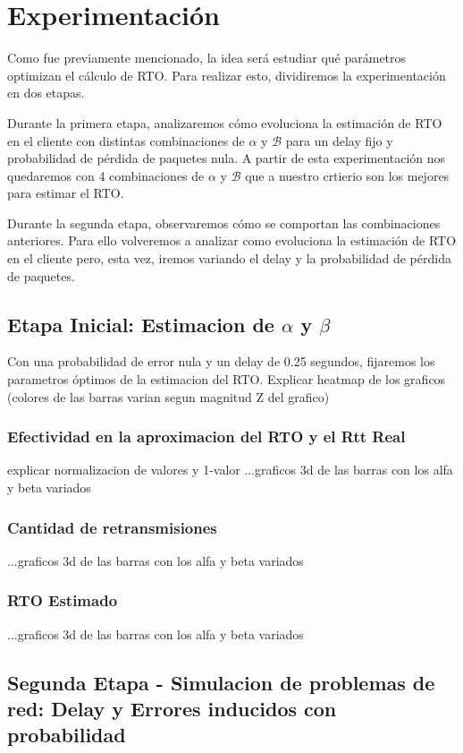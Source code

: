 \section{Experimentaci\'on}

Como fue previamente mencionado, la idea ser\'a estudiar qu\'e par\'ametros optimizan el c\'alculo de RTO. Para realizar esto, dividiremos la experimentaci\'on en dos etapas.

Durante la primera etapa, analizaremos c\'omo evoluciona la estimaci\'on de RTO en el cliente con distintas combinaciones de $\alpha$ y $\mathcal{B}$ para un delay fijo y probabilidad de p\'erdida de paquetes nula. A partir de esta experimentaci\'on nos quedaremos con 4 combinaciones de $\alpha$ y $\mathcal{B}$ que a nuestro crtierio son los mejores para estimar el RTO.

Durante la segunda etapa, observaremos c\'omo se comportan las combinaciones anteriores. Para ello volveremos a analizar como evoluciona la estimaci\'on de RTO en el cliente pero, esta vez, iremos variando el delay y la probabilidad de p\'erdida de paquetes. 

\subsection{Etapa Inicial: Estimacion de $\alpha$ y $\beta$}
Con una probabilidad de error nula y un delay de 0.25 segundos, fijaremos los parametros \'optimos de la estimacion del RTO.
Explicar heatmap de los graficos (colores de las barras varian segun magnitud Z del grafico)

\subsubsection{Efectividad en la aproximacion del RTO y el Rtt Real}
	explicar normalizacion de valores y 1-valor
	...graficos 3d de las barras con los alfa y beta variados

\subsubsection{Cantidad de retransmisiones}
	...graficos 3d de las barras con los alfa y beta variados

\subsubsection{RTO Estimado}
	...graficos 3d de las barras con los alfa y beta variados

\subsection{Segunda Etapa - Simulacion de problemas de red: Delay y Errores inducidos con probabilidad}